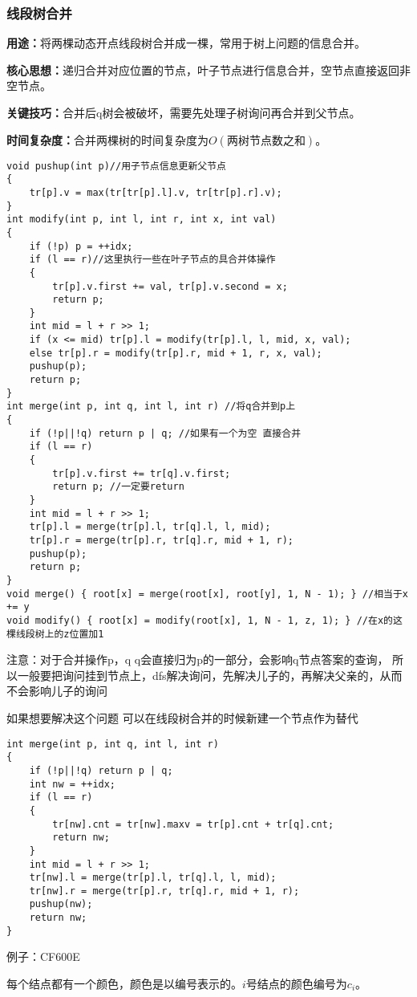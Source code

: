 \documentclass[a4paper,fontset=none]{ctexart}
\begin{document}
\subsubsection{线段树合并}
\textbf{用途：}将两棵动态开点线段树合并成一棵，常用于树上问题的信息合并。

\textbf{核心思想：}递归合并对应位置的节点，叶子节点进行信息合并，空节点直接返回非空节点。

\textbf{关键技巧：}合并后q树会被破坏，需要先处理子树询问再合并到父节点。

\textbf{时间复杂度：}合并两棵树的时间复杂度为$O(\text{两树节点数之和})$。
\begin{verbatim}
void pushup(int p)//用子节点信息更新父节点
{
    tr[p].v = max(tr[tr[p].l].v, tr[tr[p].r].v);
}
int modify(int p, int l, int r, int x, int val)
{
    if (!p) p = ++idx;
    if (l == r)//这里执行一些在叶子节点的具合并体操作
    {
        tr[p].v.first += val, tr[p].v.second = x;
        return p;
    }
    int mid = l + r >> 1;
    if (x <= mid) tr[p].l = modify(tr[p].l, l, mid, x, val);
    else tr[p].r = modify(tr[p].r, mid + 1, r, x, val);
    pushup(p);
    return p;
}
int merge(int p, int q, int l, int r) //将q合并到p上
{
    if (!p||!q) return p | q; //如果有一个为空 直接合并
    if (l == r)
    {
        tr[p].v.first += tr[q].v.first;
        return p; //一定要return
    }
    int mid = l + r >> 1;
    tr[p].l = merge(tr[p].l, tr[q].l, l, mid);
    tr[p].r = merge(tr[p].r, tr[q].r, mid + 1, r);
    pushup(p);
    return p;
}
void merge() { root[x] = merge(root[x], root[y], 1, N - 1); } //相当于x += y
void modify() { root[x] = modify(root[x], 1, N - 1, z, 1); } //在x的这棵线段树上的z位置加1
\end{verbatim}
注意：对于合并操作p，q \quad q会直接归为p的一部分，会影响q节点答案的查询，
所以一般要把询问挂到节点上，dfs解决询问，先解决儿子的，再解决父亲的，从而不会影响儿子的询问

如果想要解决这个问题 可以在线段树合并的时候新建一个节点作为替代
\begin{verbatim}
int merge(int p, int q, int l, int r)
{
    if (!p||!q) return p | q;
    int nw = ++idx;
    if (l == r)
    {
        tr[nw].cnt = tr[nw].maxv = tr[p].cnt + tr[q].cnt;
        return nw;
    }
    int mid = l + r >> 1;
    tr[nw].l = merge(tr[p].l, tr[q].l, l, mid);
    tr[nw].r = merge(tr[p].r, tr[q].r, mid + 1, r);
    pushup(nw);
    return nw;
}
\end{verbatim}

例子：CF600E

每个结点都有一个颜色，颜色是以编号表示的。$i$号结点的颜色编号为$c_i$。
\end{document}
